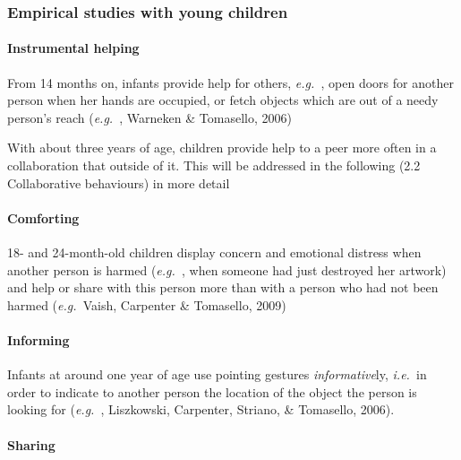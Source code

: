\documentclass{article}
\newcommand{\ie}{{\textit{i.e.~}}}
\newcommand{\eg}{{\textit{e.g.~}}}
\begin{document}
\subsubsection{Empirical studies with young children}


\paragraph{Instrumental helping}

From 14 months on, infants provide help for others, \eg, open doors for
another person when her hands are occupied, or fetch objects which are out of a
needy person's reach (\eg, Warneken \& Tomasello, 2006)

With about three years of age, children provide help to a peer more often
in a collaboration that outside of it.  This will be addressed in the following
(2.2 Collaborative behaviours) in more detail

\paragraph{Comforting}

18- and 24-month-old children display concern and emotional distress when
another person is harmed (\eg, when someone had just destroyed her artwork) and
help or share with this person more than with a person who had not been harmed
(\eg Vaish, Carpenter \& Tomasello, 2009) 

\paragraph{Informing}

Infants at around one year of age use pointing gestures \emph{informative}ly,
\ie in order to indicate to another person the location of the object the
person is looking for (\eg, Liszkowski, Carpenter, Striano, \& Tomasello, 2006).

\paragraph{Sharing}
\end{document}
